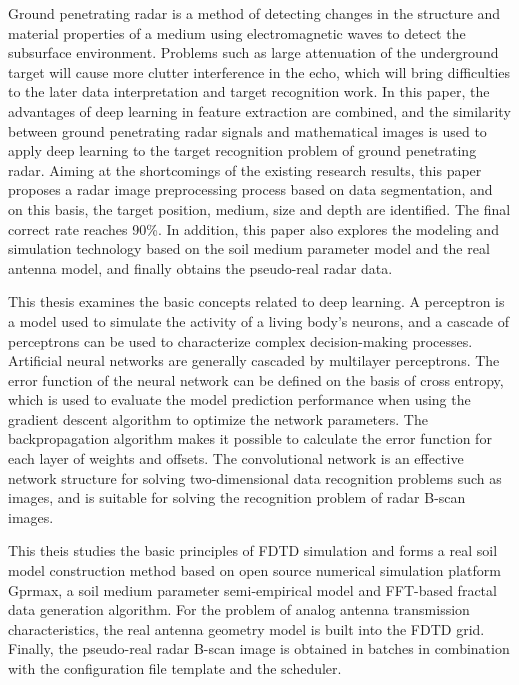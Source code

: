 
\begin{englishabstract}
	Ground penetrating radar is a method of detecting changes in the structure and material properties of a medium using electromagnetic waves to detect the subsurface environment. Problems such as large attenuation of the underground target will cause more clutter interference in the echo, which will bring difficulties to the later data interpretation and target recognition work. In this paper, the advantages of deep learning in feature extraction are combined, and the similarity between ground penetrating radar signals and mathematical images is used to apply deep learning to the target recognition problem of ground penetrating radar. Aiming at the shortcomings of the existing research results, this paper proposes a radar image preprocessing process based on data segmentation, and on this basis, the target position, medium, size and depth are identified. The final correct rate reaches 90\%. In addition, this paper also explores the modeling and simulation technology based on the soil medium parameter model and the real antenna model, and finally obtains the pseudo-real radar data.
	
	This thesis examines the basic concepts related to deep learning. A perceptron is a model used to simulate the activity of a living body's neurons, and a cascade of perceptrons can be used to characterize complex decision-making processes. Artificial neural networks are generally cascaded by multilayer perceptrons. The error function of the neural network can be defined on the basis of cross entropy, which is used to evaluate the model prediction performance when using the gradient descent algorithm to optimize the network parameters. The backpropagation algorithm makes it possible to calculate the error function for each layer of weights and offsets. The convolutional network is an effective network structure for solving two-dimensional data recognition problems such as images, and is suitable for solving the recognition problem of radar B-scan images. 
	
	This theis studies the basic principles of FDTD simulation and forms a real soil model construction method based on open source numerical simulation platform Gprmax, a soil medium parameter semi-empirical model and FFT-based fractal data generation algorithm. For the problem of analog antenna transmission characteristics, the real antenna geometry model is built into the FDTD grid. Finally, the pseudo-real radar B-scan image is obtained in batches in combination with the configuration file template and the scheduler. 
	

\end{englishabstract}
